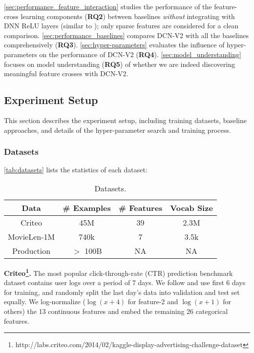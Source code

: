 \documentclass[sigconf]{acmart}
\begin{document}
\autoref{sec:performance_feature_interaction} studies the performance of the feature-cross learning components (\textbf{RQ2}) between baselines \emph{without} integrating with DNN ReLU layers (similar to \cite{lian2018xdeepfm, song2019autoint}); only sparse features are considered for a clean comparison. \autoref{sec:performance_baselines} compares {DCN-V2} with all the baselines comprehensively (\textbf{RQ3}). \autoref{sec:hyper-parameters} evaluates the influence of hyper-parameters on the performance of {DCN-V2} (\textbf{RQ4}). \autoref{sec:model_understanding} focuses on model understanding (\textbf{RQ5}) of whether we are indeed discovering meaningful feature crosses with {DCN-V2}. 


\subsection{Experiment Setup}
\label{sec:experiment_setup}
This section describes the experiment setup, including training datasets, baseline approaches, and details of the hyper-parameter search and training process.
\subsubsection{Datasets}
\autoref{tab:datasets} lists the statistics of each dataset:


\begin{table}[htpb]
\small
\caption{Datasets.}
\vspace{-3.5ex}
\label{tab:datasets}
\begin{center}
\begin{tabular}{c|ccc}
\toprule
{\bf Data} & \# Examples & \# Features & Vocab Size \\
\midrule
Criteo & 45M & 39 & 2.3M\\
MovieLen-1M &  740k & 7 & 3.5k\\
Production & $>$ 100B & NA & NA\\
\bottomrule
\end{tabular}
\end{center}
\end{table}

{\bf Criteo\footnote{http://labs.criteo.com/2014/02/kaggle-display-advertising-challenge-dataset}.} The most popular click-through-rate (CTR) prediction benchmark dataset contains user logs over a period of 7 days. We follow \cite{wang2017deep, song2019autoint} and use first 6 days for training, and randomly split the last day's data into validation and test set equally. We log-normalize ($\log(x+4)$ for feature-2 and $\log(x+1)$ for others) the 13 continuous features and embed the remaining 26 categorical features.
\end{document}
